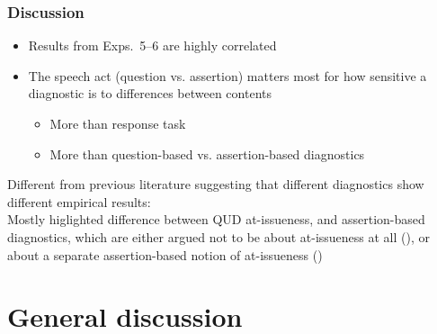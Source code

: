 \documentclass[compress, xcolor = dvipsnames, aspectratio=169, handout]{beamer}
\begin{document}
	\begin{frame}\frametitle{Discussion}
		
		\begin{itemize}
			\item Results from Exps.~5–6 are highly correlated 
			\item The speech act (question vs. assertion) matters most for how sensitive a diagnostic is to differences between contents
			\begin{itemize}
				\item More than response task
				\item More than question-based vs. assertion-based diagnostics
			\end{itemize}
		\end{itemize} \vfill 

		{\scriptsize Different from previous literature suggesting that different diagnostics show different empirical results:\\
		Mostly higlighted difference between QUD at-issueness, and assertion-based diagnostics, which are either argued not to be about at-issueness at all (\citealt{snider_anaphoric_2017,snider_at-issuenessne_2017,snider_distinguishing_2018}), or about a separate assertion-based notion of at-issueness (\citealt{koev_notions_2018,faller_discourse_2019,korotkova_evidential_2020})}

	\end{frame}	

\section{General discussion}
\end{document}
